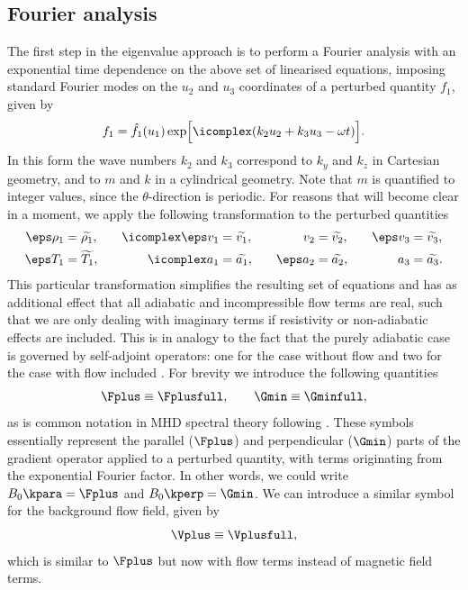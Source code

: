\subsection{Fourier analysis} \label{ss: fourier}
The first step in the eigenvalue approach is to perform a Fourier analysis with an exponential time dependence on the above set of linearised equations, imposing standard Fourier modes on the $u_2$ and $u_3$ coordinates of a perturbed quantity $f_1$, given by
\begin{equation} \label{eq: fourier_analysis}
  f_1 = \hat{f_1}(u_1)\exp\Bigl[\icomplex(k_2 u_2 + k_3 u_3 - \omega t)\Bigr].
\end{equation}
In this form the wave numbers $k_2$ and $k_3$ correspond to $k_y$ and $k_z$ in Cartesian geometry, and to $m$ and $k$ in a cylindrical geometry. Note that $m$ is quantified to integer values, since the $\theta$-direction is periodic. For reasons that will become clear in a moment, we apply the following transformation to the perturbed quantities
\begin{equation}
  \begin{alignedat}{4} \label{eq: transformation}
    \eps \rho_1 &= \widetilde{\rho_1},
    \qquad&
    \icomplex \eps v_1 &= \widetilde{v_1},
    \qquad&
    v_2 &= \widetilde{v_2},
    \qquad&
    \eps v_3 &= \widetilde{v_3}, \\
    \eps T_1 &= \widetilde{T_1},
    &
    \icomplex a_1 &= \widetilde{a_1},
    &
    \eps a_2 &= \widetilde{a_2},
    &
    a_3 &= \widetilde{a_3}. \\
  \end{alignedat}
\end{equation}
This particular transformation simplifies the resulting set of equations and has as additional effect that all adiabatic and incompressible flow terms are real, such that we are only dealing with imaginary terms if resistivity or non-adiabatic effects are included. This is in analogy to the fact that the purely adiabatic case is governed by self-adjoint operators: one for the case without flow and two for the case with flow included \citep{goedbloed2018_web1,goedbloed2018_web2}. For brevity we introduce the following quantities
\begin{equation} \label{eq: F_G_operators}
  \Fplus \equiv \Fplusfull,
  \qquad
  \Gmin \equiv \Gminfull,
\end{equation}
as is common notation in MHD spectral theory following \citet{book_MHD}. These symbols essentially represent the parallel ($\Fplus$) and perpendicular ($\Gmin$) parts of the gradient operator applied to a perturbed quantity, with terms originating from the exponential Fourier factor. In other words, we could write $B_0 \kpara = \Fplus$
and $B_0 \kperp = \Gmin$. We can introduce a similar symbol for the background flow field, given by
\begin{equation} \label{eq: V_operator}
  \Vplus \equiv \Vplusfull,
\end{equation}
which is similar to $\Fplus$ but now with flow terms instead of magnetic field terms.

